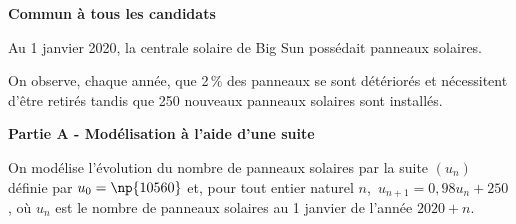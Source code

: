 
\textbf{Commun à tous les candidats}

\medskip

Au 1 janvier 2020, la centrale solaire de Big Sun possédait  panneaux solaires.

On observe, chaque année, que 2\,\% des panneaux se sont détériorés et nécessitent d'être retirés tandis que 250 nouveaux panneaux solaires sont installés.

\bigskip

\textbf{Partie A - Modélisation à l'aide d'une suite}

\medskip

On modélise l'évolution du nombre de panneaux solaires par la suite $\left(u_n\right)$ définie par $u_0 = \np{10560}$ et, pour tout entier naturel $n$,\, $u_{n+1} = 0,98u_n +250$, où $u_n$  est le nombre de panneaux solaires au 1 janvier de l'année $2020 +n$.

\medskip

